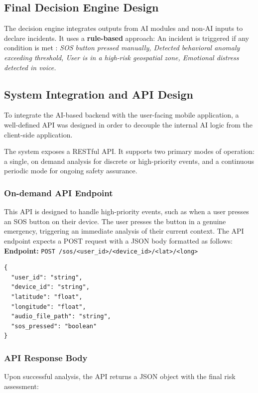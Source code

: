 \documentclass[12pt,a4paper,oneside,english]{book}
\begin{document}
\subsection{Final Decision Engine Design}
The decision engine integrates outputs from AI modules and non-AI inputs to declare incidents. It uses a \textbf{rule-based} approach: 
An incident is triggered if any condition is met :
\textit{SOS button pressed manually, Detected behavioral anomaly exceeding threshold, User is in a high-risk geospatial zone, Emotional distress detected in voice.}

\subsection{System Integration and API Design}
To integrate the AI-based backend with the user-facing mobile application, 
a well-defined API was designed in order to decouple the internal AI logic from the client-side application.

The system exposes a RESTful API. It supports two primary modes of operation: a single, on demand analysis for
  discrete or high-priority events, and a continuous periodic mode for ongoing safety assurance.


\subsubsection{On-demand API Endpoint}
This API is designed to handle high-priority events, such as when a user presses an SOS button on their device.%
The user presses the button in a genuine emergency, triggering an immediate analysis of their current context.
The API endpoint expects a POST request with a JSON body formatted as follows:
\textbf{Endpoint:} \verb|POST /sos/<user_id>/<device_id>/<lat>/<long> |
\begin{lstlisting}[style=jsonstyle-compact]
{
  "user_id": "string",
  "device_id": "string",
  "latitude": "float",
  "longitude": "float",
  "audio_file_path": "string",
  "sos_pressed": "boolean"
}
\end{lstlisting}

\subsubsection{API Response Body}
Upon successful analysis, the API returns a JSON object with the final risk assessment:
\end{document}
